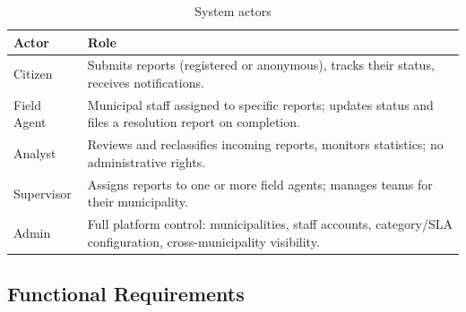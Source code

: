 \begin{table}[h!]
\centering
\begin{tabularx}{\textwidth}{lX}
\toprule
\textbf{Actor} & \textbf{Role} \\
\midrule
Citizen        & Submits reports (registered or anonymous), tracks their status, receives notifications. \\
Field Agent    & Municipal staff assigned to specific reports; updates status and files a resolution report on completion. \\
Analyst        & Reviews and reclassifies incoming reports, monitors statistics; no administrative rights. \\
Supervisor     & Assigns reports to one or more field agents; manages teams for their municipality. \\
Admin          & Full platform control: municipalities, staff accounts, category/SLA configuration, cross-municipality visibility. \\
\bottomrule
\end{tabularx}
\caption{System actors}
\label{tab:actors}
\end{table}

\subsection{Functional Requirements}

